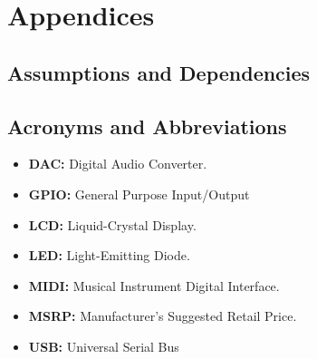 \section{Appendices}

\subsection{Assumptions and Dependencies}
\subsection{Acronyms and Abbreviations}
    \begin{itemize}
        \item \label{DAC} \textbf{DAC:} Digital Audio Converter.
        \item \label{GPIO} \textbf{GPIO:} General Purpose Input/Output
        \item \label{LCD} \textbf{LCD:} Liquid-Crystal Display.
        \item \label{LED} \textbf{LED:} Light-Emitting Diode.
        \item \label{MIDI} \textbf{MIDI:} Musical Instrument Digital Interface.
        \item \label{MSRP} \textbf{MSRP:} Manufacturer's Suggested Retail Price.
        \item \label{USB} \textbf{USB:} Universal Serial Bus
    \end{itemize}